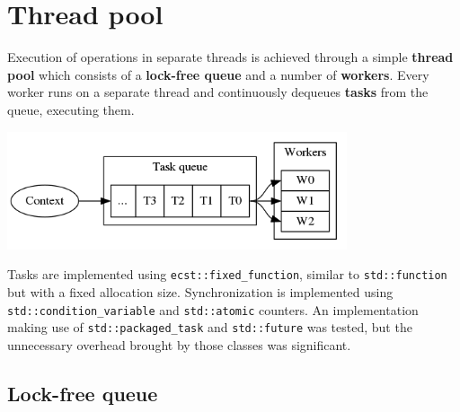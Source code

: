 \documentclass[twoside, 12pt, a4paper, openany]{book}
\let\origfigure=\figure
\let\endorigfigure=\endfigure
\renewenvironment{figure}[1][]{%
\origfigure[H]
}{%
\endorigfigure
}
\begin{document}
\section{Thread pool}\label{thread-pool}

Execution of operations in separate threads is achieved through a simple
\textbf{thread pool} which consists of a \textbf{lock-free queue} and a
number of \textbf{workers}. Every worker runs on a separate thread and
continuously dequeues \textbf{tasks} from the queue, executing them.

\begin{figure}[htbp]
\centering
\includegraphics[width=0.75000\textwidth]{source/figures/generated/ecst/multithreading/threadpool.png}
\caption{ECST multithreading: thread-pool architecture}
\end{figure}

Tasks are implemented using
\texttt{ecst::fixed_function},
similar to
\texttt{std::function}
but with a fixed allocation size. Synchronization is implemented using
\texttt{std::condition_variable}
and
\texttt{std::atomic}
counters. An implementation making use of
\texttt{std::packaged_task}
and
\texttt{std::future}
was tested, but the unnecessary overhead brought by those classes was
significant.

\subsection{Lock-free queue}\label{lock-free-queue}
\end{document}
